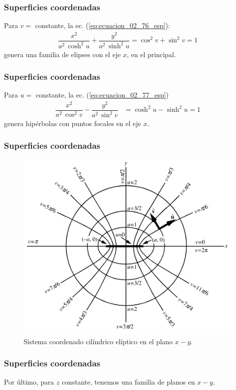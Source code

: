 \documentclass[12pt]{beamer}
\begin{document}
\begin{frame}
\frametitle{Superficies coordenadas}
Para $v = $ constante, la ec. (\ref{eq:ecuacion_02_76_esp}):
\begin{align*}
\dfrac{x^{2}}{a^{2} \, \cosh^{2} u} + \dfrac{y^{2}}{a^{2} \, \sinh^{2} u} = \cos^{2} v + \sin^{2} v = 1 
\end{align*}
genera una familia de elipses con el eje $x$, en el principal.
\end{frame}
\begin{frame}
\frametitle{Superficies coordenadas}
Para $u = $ constante, la ec. (\ref{eq:ecuacion_02_77_esp})
\begin{align*}
\dfrac{x^{2}}{a^{2} \, \cos^{2} v} - \dfrac{y^{2}}{a^{2} \, \sin^{2} v } &= \cosh^{2} u - \sinh^{2} u = 1
\end{align*}
genera hipérbolas con puntos focales en el eje $x$.
\end{frame}
\begin{frame}
\frametitle{Superficies coordenadas}
\begin{figure}[H]
    \centering
    \includegraphics[scale=0.55]{Imagenes/EllipticCylindricalCoord_1000.png}
    \caption{Sistema coordenado cilíndrico elíptico en el plano $x-y$.}
    \label{fig:figura_coordenada_cilindricas_elipticas}
\end{figure}
\end{frame}
\begin{frame}
\frametitle{Superficies coordenadas}
Por último, para $z$ constante, tenemos una familia de planos en $x - y$.
\end{frame}  
\end{document}
